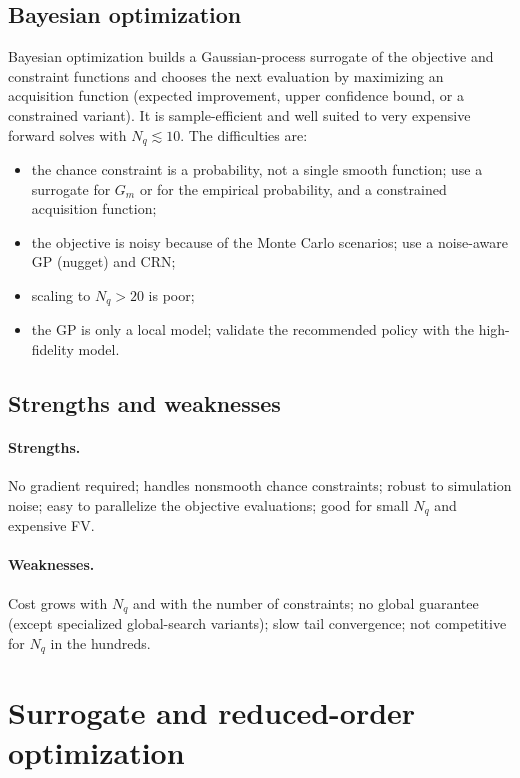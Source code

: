 \documentclass[11pt]{article}
\numberwithin{equation}{section}
\theoremstyle{plain}
\begin{document}
\subsection{Bayesian optimization}

Bayesian optimization builds a Gaussian-process surrogate of the objective and
constraint functions and chooses the next evaluation by maximizing an
acquisition function (expected improvement, upper confidence bound, or a
constrained variant).  It is sample-efficient and well suited to very
expensive forward solves with $N_q\lesssim10$.  The difficulties are:
\begin{itemize}[leftmargin=1.6em,itemsep=2pt]
  \item the chance constraint is a probability, not a single smooth function;
        use a surrogate for $G_m$ or for the empirical probability, and a
        constrained acquisition function;
  \item the objective is noisy because of the Monte Carlo scenarios; use a
        noise-aware GP (nugget) and CRN;
  \item scaling to $N_q>20$ is poor;
  \item the GP is only a local model; validate the recommended policy with the
        high-fidelity model.
\end{itemize}

\subsection{Strengths and weaknesses}

\paragraph{Strengths.}  No gradient required; handles nonsmooth chance
constraints; robust to simulation noise; easy to parallelize the objective
evaluations; good for small $N_q$ and expensive FV.

\paragraph{Weaknesses.}  Cost grows with $N_q$ and with the number of
constraints; no global guarantee (except specialized global-search variants);
slow tail convergence; not competitive for $N_q$ in the hundreds.

\section{Surrogate and reduced-order optimization}
\label{sec:surrogate}
\end{document}
